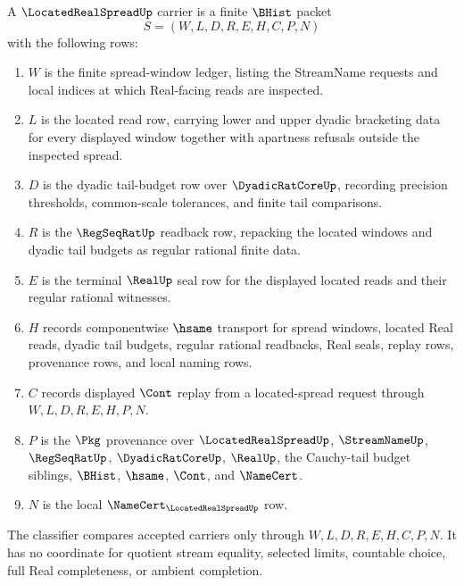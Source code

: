 \begin{definition}
\label{def:located-real-spread-carrier}
A $\LocatedRealSpreadUp$ carrier is a finite $\BHist$ packet
$$
S=(W,L,D,R,E,H,C,P,N)
$$
with the following rows:
\begin{enumerate}
\item $W$ is the finite spread-window ledger, listing the StreamName requests and local indices at which Real-facing reads are inspected.
\item $L$ is the located read row, carrying lower and upper dyadic bracketing data for every displayed window together with apartness refusals outside the inspected spread.
\item $D$ is the dyadic tail-budget row over $\DyadicRatCoreUp$, recording precision thresholds, common-scale tolerances, and finite tail comparisons.
\item $R$ is the $\RegSeqRatUp$ readback row, repacking the located windows and dyadic tail budgets as regular rational finite data.
\item $E$ is the terminal $\RealUp$ seal row for the displayed located reads and their regular rational witnesses.
\item $H$ records componentwise $\hsame$ transport for spread windows, located Real reads, dyadic tail budgets, regular rational readbacks, Real seals, replay rows, provenance rows, and local naming rows.
\item $C$ records displayed $\Cont$ replay from a located-spread request through $W,L,D,R,E,H,P,N$.
\item $P$ is the $\Pkg$ provenance over $\LocatedRealSpreadUp$, $\StreamNameUp$, $\RegSeqRatUp$, $\DyadicRatCoreUp$, $\RealUp$, the Cauchy-tail budget siblings, $\BHist$, $\hsame$, $\Cont$, and $\NameCert$.
\item $N$ is the local $\NameCert_{\LocatedRealSpreadUp}$ row.
\end{enumerate}
The classifier compares accepted carriers only through $W,L,D,R,E,H,C,P,N$. It has no coordinate for quotient stream equality, selected limits, countable choice, full Real completeness, or ambient completion.
\end{definition}

